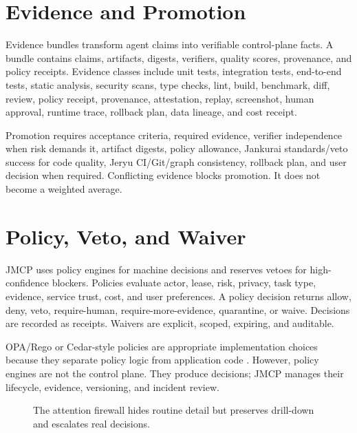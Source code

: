 \documentclass[10pt,journal,onecolumn]{IEEEtran}
\begin{document}
\section{Evidence and Promotion}
Evidence bundles transform agent claims into verifiable control-plane facts. A bundle contains claims, artifacts, digests, verifiers, quality scores, provenance, and policy receipts. Evidence classes include unit tests, integration tests, end-to-end tests, static analysis, security scans, type checks, lint, build, benchmark, diff, review, policy receipt, provenance, attestation, replay, screenshot, human approval, runtime trace, rollback plan, data lineage, and cost receipt.

Promotion requires acceptance criteria, required evidence, verifier independence when risk demands it, artifact digests, policy allowance, Jankurai standards/veto success for code quality, Jeryu CI/Git/graph consistency, rollback plan, and user decision when required. Conflicting evidence blocks promotion. It does not become a weighted average.

\section{Policy, Veto, and Waiver}
JMCP uses policy engines for machine decisions and reserves vetoes for high-confidence blockers. Policies evaluate actor, lease, risk, privacy, task type, evidence, service trust, cost, and user preferences. A policy decision returns allow, deny, veto, require-human, require-more-evidence, quarantine, or waive. Decisions are recorded as receipts. Waivers are explicit, scoped, expiring, and auditable.

OPA/Rego or Cedar-style policies are appropriate implementation choices because they separate policy logic from application code \cite{opa}. However, policy engines are not the control plane. They produce decisions; JMCP manages their lifecycle, evidence, versioning, and incident review.


\begin{figure}[t]
\centering
{}
\caption{The attention firewall hides routine detail but preserves drill-down and escalates real decisions.}
\label{fig:attention}
\end{figure}
\end{document}
